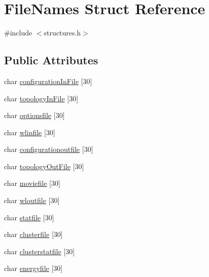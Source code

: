 \hypertarget{struct_file_names}{\section{File\+Names Struct Reference}
\label{struct_file_names}
}


{\ttfamily \#include $<$structures.\+h$>$}

\subsection*{Public Attributes}
\begin{DoxyCompactItemize}
\item 
char \hyperlink{struct_file_names_a58929a6b23a9ac4228d1bcdf483ad638}{configuration\+In\+File} \mbox{[}30\mbox{]}
\item 
char \hyperlink{struct_file_names_a54b01865d6a5c2988798aa0a0062d7f9}{topology\+In\+File} \mbox{[}30\mbox{]}
\item 
char \hyperlink{struct_file_names_aef0ce496bdcc9b924a111438a1e16573}{optionsfile} \mbox{[}30\mbox{]}
\item 
char \hyperlink{struct_file_names_af41fd595b79047dfee97d3a66aa7ef40}{wlinfile} \mbox{[}30\mbox{]}
\item 
char \hyperlink{struct_file_names_a6d96709d8d21f5194c072ef80db0e8a7}{configurationoutfile} \mbox{[}30\mbox{]}
\item 
char \hyperlink{struct_file_names_a53dd4679e96bec4dcda714cf0b8f96de}{topology\+Out\+File} \mbox{[}30\mbox{]}
\item 
char \hyperlink{struct_file_names_ab6920a417c86a04aa771c248f75c6bf9}{moviefile} \mbox{[}30\mbox{]}
\item 
char \hyperlink{struct_file_names_ad3186b4b1d3a03d1cce61385475df1a9}{wloutfile} \mbox{[}30\mbox{]}
\item 
char \hyperlink{struct_file_names_a571bce947227b34ce9056cbff89c02b3}{statfile} \mbox{[}30\mbox{]}
\item 
char \hyperlink{struct_file_names_a308f1e0e953456ba44b873a1a336d707}{clusterfile} \mbox{[}30\mbox{]}
\item 
char \hyperlink{struct_file_names_a531ef786f58d7d412c6f841dd252e906}{clusterstatfile} \mbox{[}30\mbox{]}
\item 
char \hyperlink{struct_file_names_aab15a15f40bcf78ab8e6a00da44bc672}{energyfile} \mbox{[}30\mbox{]}
\end{DoxyCompactItemize}


